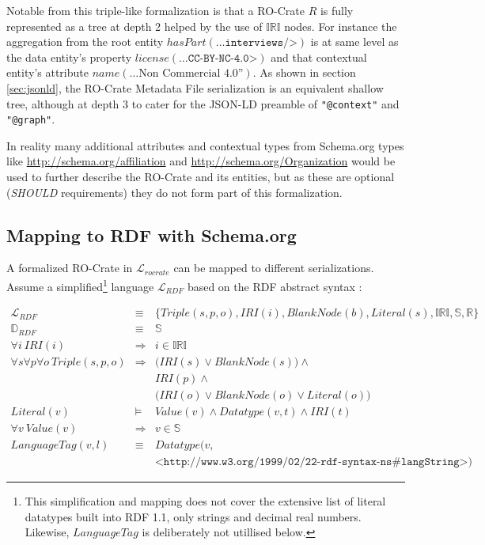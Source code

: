 Notable from this triple-like formalization is that a RO-Crate $R$ is fully represented as a tree at depth 2 helped by the use of $\mathbb{IRI}$  nodes. For instance the aggregation from the root entity $hasPart(\texttt{…interviews/>})$ is at same level as the data entity’s property $license(\texttt{…CC-BY-NC-4.0>})$ and that contextual entity’s attribute $ name(\text{…Non Commercial 4.0”})$. As shown in section \ref{sec:jsonld}, the RO-Crate Metadata File serialization is an equivalent shallow tree, although at depth 3 to cater for the JSON-LD preamble of \texttt{"@context"} and \texttt{"@graph"}.

In reality many additional attributes and contextual types from Schema.org types like \url{http://schema.org/affiliation} and \url{http://schema.org/Organization} would be used to further describe the RO-Crate and its entities, but as these are optional (\textit{SHOULD} requirements) they do not form part of this formalization.


\subsection{Mapping to RDF with Schema.org}

A formalized RO-Crate in $\mathcal{L}_{rocrate}$ can be mapped to different serializations.
Assume a simplified\footnote{
 This simplification and mapping does not cover the extensive list of literal datatypes built into RDF 1.1, only strings and decimal real numbers. Likewise, $LanguageTag$ is deliberately not utillised below.
} language $\mathcal{L}_{RDF}$
based on the RDF abstract syntax \cite{RDF 1.1 2014}:

\small
\begin{eqnarray*}
\mathcal{L}_{RDF}           & \equiv &      \big\{ Triple(s,p,o), IRI(i), BlankNode(b), Literal(s),
    \mathbb{IRI}, \mathbb{S}, \mathbb{R}    \big\} \\
\mathbb{D}_{RDF}            & \equiv &      \mathbb{S} \\
\forall i \ IRI(i)          & \Rightarrow & i \in \mathbb{IRI} \\
\forall s \forall p \forall o \
    Triple(s,p,o)           & \Rightarrow & \Big( IRI(s) \lor BlankNode(s) \Big) \land  \\
                            & &             IRI(p) \land  \\
                            & &             \Big(IRI(o) \lor BlankNode(o) \lor Literal(o) \Big) \\
Literal(v)                  & \models &     Value(v) \land Datatype(v,t) \land IRI(t) \\
\forall v \ Value(v)        & \Rightarrow & v \in \mathbb{S} \\
LanguageTag(v, l)           & \equiv &      Datatype\big(v, \\
    && \texttt{<http://www.w3.org/1999/02/22-rdf-syntax-ns\#langString>}\big)
\end{eqnarray*}
\normalsize

